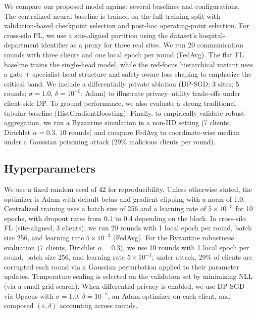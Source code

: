 \documentclass[journal,article,submit,pdftex,moreauthors]{Definitions/mdpi}
\begin{document}
We compare our proposed model against several baselines and configurations. The centralized neural baseline is trained on the full training split with validation-based checkpoint selection and post-hoc operating-point selection. For cross-silo FL, we use a site-aligned partition using the dataset's hospital-department identifier as a proxy for three real sites. We run 20 communication rounds with three clients and one local epoch per round (FedAvg). The flat FL baseline trains the single-head model, while the red-focus hierarchical variant uses a gate + specialist-head structure and safety-aware loss shaping to emphasize the critical band. We include a differentially private ablation (DP-SGD; 3 sites; 5 rounds; $\sigma=1.0$, $\delta=10^{-5}$; Adam) to illustrate privacy--utility trade-offs under client-side DP. To ground performance, we also evaluate a strong traditional tabular baseline (HistGradientBoosting). Finally, to empirically validate robust aggregation, we run a Byzantine simulation in a non-IID setting (7 clients, Dirichlet $\alpha=0.3$, 10 rounds) and compare FedAvg to coordinate-wise median under a Gaussian poisoning attack (29\% malicious clients per round).

\subsection{Hyperparameters}

We use a fixed random seed of 42 for reproducibility. Unless otherwise stated, the optimizer is Adam with default betas and gradient clipping with a norm of 1.0. Centralized training uses a batch size of 256 and a learning rate of $5\times 10^{-3}$ for 10 epochs, with dropout rates from 0.1 to 0.4 depending on the block. In cross-silo FL (site-aligned, 3 clients), we run 20 rounds with 1 local epoch per round, batch size 256, and learning rate $5\times 10^{-3}$ (FedAvg). For the Byzantine robustness evaluation (7 clients, Dirichlet $\alpha=0.3$), we use 10 rounds with 1 local epoch per round, batch size 256, and learning rate $5\times 10^{-3}$; under attack, 29\% of clients are corrupted each round via a Gaussian perturbation applied to their parameter updates. Temperature scaling is selected on the validation set by minimizing NLL (via a small grid search). When differential privacy is enabled, we use DP-SGD via Opacus with $\sigma=1.0$, $\delta=10^{-5}$, an Adam optimizer on each client, and composed $(\varepsilon,\delta)$ accounting across rounds.
\end{document}

